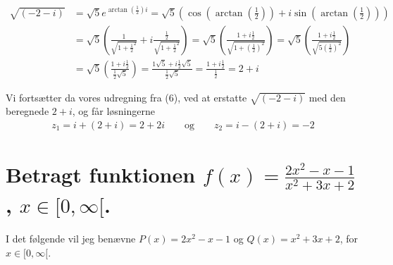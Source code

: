 \documentclass[11pt,a4paper]{article}
\begin{document}
\begin{align}
    \sqrt{(-2 - i)}
    &= \sqrt{5} e^{\arctan(\frac{1}{2}) i}
     = \sqrt{5} \left(
        \cos \left( \arctan \left( \frac{1}{2} \right) \right)
        + i \sin \left( \arctan \left( \frac{1}{2} \right) \right) \right) \\
\iffalse
    &= \sqrt{5} \left(
       \cos \left( \frac{ \sin(-1 / \sqrt{5}) }{ \cos(-2 / \sqrt{5})} \right)
   + i \sin \left( \frac{ \sin(-1 / \sqrt{5}) }{ \cos(-2 / \sqrt{5})} \right)
     \right) \\
    &= \sqrt{5} \left(
       \cos \left( \frac{ \sin(1 / \sqrt{5}) }{ \cos(2 / \sqrt{5})} \right)
   + i \sin \left( \frac{ \sin(1 / \sqrt{5}) }{ \cos(2 / \sqrt{5})} \right)
     \right) \\
\fi
   &= \sqrt{5} \left( \frac{1}{\sqrt{1 + \frac{1}{2}^2}}
   + i \frac{ \frac{1}{2} }{\sqrt{1 + \frac{1}{2}^2}}\right)
    = \sqrt{5} \left( \frac{1 + i \frac{1}{2}}{\sqrt{1 + \left( \frac{1}{2} \right)^2}} \right)
    = \sqrt{5} \left( \frac{1 + i \frac{1}{2}}{\sqrt{5 \left( \frac{1}{2} \right)^2 }} \right) \\
   &= \sqrt{5} \left( \frac{1 + i \frac{1}{2}}{\frac{1}{2} \sqrt{5}} \right)
    = \frac{1 \sqrt{5} + i \frac{1}{2} \sqrt{5}}{\frac{1}{2} \sqrt{5}}
    = \frac{1 + i \frac{1}{2}}{\frac{1}{2}}
    = 2 + i
\end{align}

Vi fortsætter da vores udregning fra (6), ved at erstatte $\sqrt{(-2 - i)}$
med den beregnede $2 + i$, og får løsningerne
\begin{align}
    z_1 = i + (2 + i) = 2 + 2i
    \qquad
    \text{og}
    \qquad
    z_2 = i - (2 + i) = -2
\end{align}

\clearpage
\section
{
    \mdseries
    Betragt funktionen $f(x) = \frac{2x^2 - x - 1}{x^2 + 3x + 2}$, $x \in
    [0,\infty[$.
}
I det følgende vil jeg benævne $P(x) = 2x^2 - x - 1$ og
$Q(x) = x^2 + 3x + 2$, for $x \in [0,\infty[$.
\end{document}
